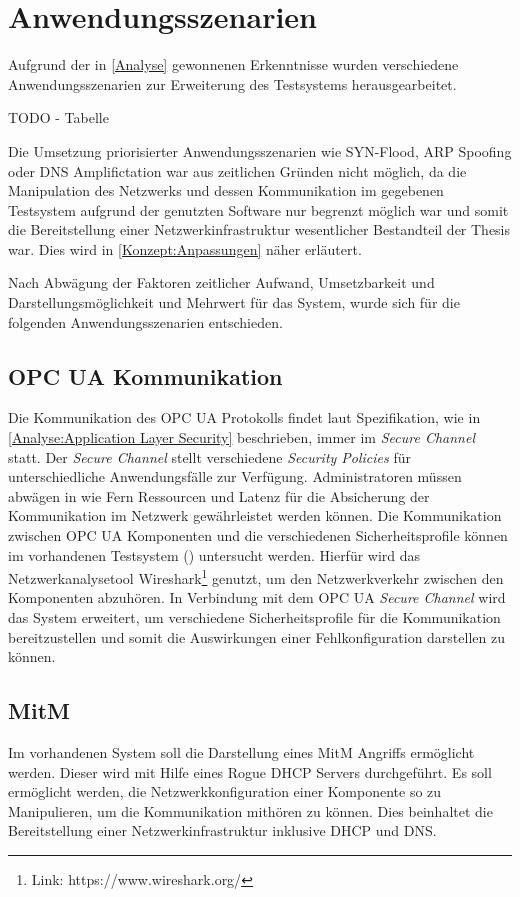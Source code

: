 \chapter{Anwendungsszenarien}
\label{Anwendungsszenarien}
Aufgrund der in \autoref{Analyse} gewonnenen Erkenntnisse wurden verschiedene Anwendungsszenarien zur Erweiterung des Testsystems herausgearbeitet.

TODO - Tabelle

Die Umsetzung priorisierter Anwendungsszenarien wie SYN-Flood, \ac{ARP} Spoofing oder \ac{DNS} Amplifictation war aus zeitlichen Gründen nicht möglich, da die Manipulation des Netzwerks und dessen Kommunikation im gegebenen Testsystem aufgrund der genutzten Software nur begrenzt möglich war und somit die Bereitstellung einer Netzwerkinfrastruktur wesentlicher Bestandteil der Thesis war. Dies wird in \autoref{Konzept:Anpassungen} näher erläutert.

Nach Abwägung der Faktoren zeitlicher Aufwand, Umsetzbarkeit und Darstellungsmöglichkeit und Mehrwert für das System, wurde sich für die folgenden Anwendungsszenarien entschieden.

\section{\ac{OPC UA} Kommunikation}
\label{Anwendungsszenarien:OPC UA Kommunikation}
Die Kommunikation des \ac{OPC UA} Protokolls findet laut Spezifikation, wie in \autoref{Analyse:Application Layer Security} beschrieben, immer im \textit{Secure Channel} statt. Der \textit{Secure Channel} stellt verschiedene \textit{Security Policies} für unterschiedliche Anwendungsfälle zur Verfügung. Administratoren müssen abwägen in wie Fern Ressourcen und Latenz für die Absicherung der Kommunikation im Netzwerk gewährleistet werden können. Die Kommunikation zwischen \ac{OPC UA} Komponenten und die verschiedenen Sicherheitsprofile können im vorhandenen Testsystem (\cite{Weber2018}) untersucht werden. Hierfür wird das Netzwerkanalysetool Wireshark\footnote{Link: https://www.wireshark.org/} genutzt, um den Netzwerkverkehr zwischen den Komponenten abzuhören. In Verbindung mit dem \ac{OPC UA} \textit{Secure Channel} wird das System erweitert, um verschiedene Sicherheitsprofile für die Kommunikation bereitzustellen und somit die Auswirkungen einer Fehlkonfiguration darstellen zu können.

\section{\ac{MitM}}
\label{Anwendungsszenarien:MitM}
Im vorhandenen System soll die Darstellung eines \ac{MitM} Angriffs ermöglicht werden. Dieser wird mit Hilfe eines Rogue \ac{DHCP} Servers durchgeführt. Es soll ermöglicht werden, die Netzwerkkonfiguration einer Komponente so zu Manipulieren, um die Kommunikation mithören zu können. Dies beinhaltet die Bereitstellung einer Netzwerkinfrastruktur inklusive \ac{DHCP} und \ac{DNS}.

